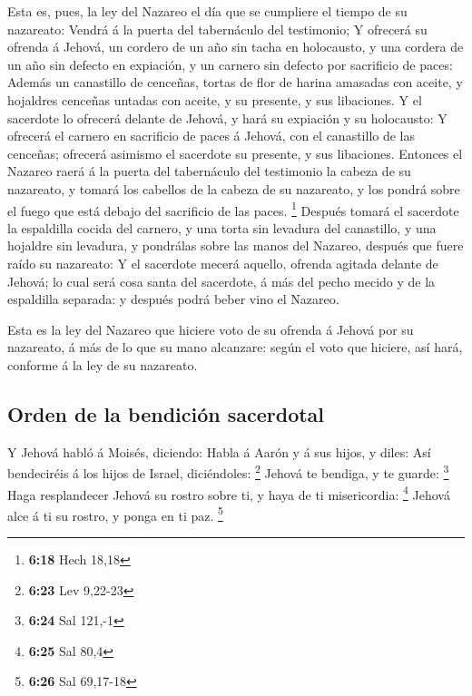  Esta es, pues, la ley del Nazareo el día que se cumpliere
el tiempo de su nazareato: Vendrá á la puerta del tabernáculo del
testimonio;  Y ofrecerá su ofrenda á Jehová, un cordero de
un año sin tacha en holocausto, y una cordera de un año sin defecto en
expiación, y un carnero sin defecto por sacrificio de paces:
 Además un canastillo de cenceñas, tortas de flor de harina
amasadas con aceite, y hojaldres cenceñas untadas con aceite, y su
presente, y sus libaciones.  Y el sacerdote lo ofrecerá
delante de Jehová, y hará su expiación y su holocausto:  Y
ofrecerá el carnero en sacrificio de paces á Jehová, con el canastillo
de las cenceñas; ofrecerá asimismo el sacerdote su presente, y sus
libaciones.  Entonces el Nazareo raerá á la puerta del
tabernáculo del testimonio la cabeza de su nazareato, y tomará los
cabellos de la cabeza de su nazareato, y los pondrá sobre el fuego que
está debajo del sacrificio de las paces. \footnote{\textbf{6:18} Hech
  18,18}  Después tomará el sacerdote la espaldilla cocida
del carnero, y una torta sin levadura del canastillo, y una hojaldre sin
levadura, y pondrálas sobre las manos del Nazareo, después que fuere
raído su nazareato:  Y el sacerdote mecerá aquello, ofrenda
agitada delante de Jehová; lo cual será cosa santa del sacerdote, á más
del pecho mecido y de la espaldilla separada: y después podrá beber vino
el Nazareo.

 Esta es la ley del Nazareo que hiciere voto de su ofrenda
á Jehová por su nazareato, á más de lo que su mano alcanzare: según el
voto que hiciere, así hará, conforme á la ley de su nazareato.

\hypertarget{orden-de-la-bendiciuxf3n-sacerdotal}{%
\subsection{Orden de la bendición
sacerdotal}\label{orden-de-la-bendiciuxf3n-sacerdotal}}

 Y Jehová habló á Moisés, diciendo:  Habla á
Aarón y á sus hijos, y diles: Así bendeciréis á los hijos de Israel,
diciéndoles: \footnote{\textbf{6:23} Lev 9,22-23}  Jehová
te bendiga, y te guarde: \footnote{\textbf{6:24} Sal 121,-1}
 Haga resplandecer Jehová su rostro sobre ti, y haya de ti
misericordia: \footnote{\textbf{6:25} Sal 80,4}  Jehová
alce á ti su rostro, y ponga en ti paz. \footnote{\textbf{6:26} Sal
  69,17-18}

